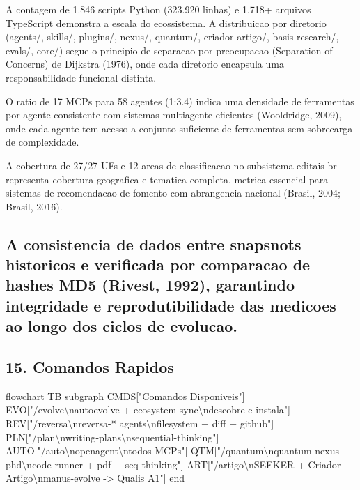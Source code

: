 \documentclass[
  12pt,
]{article}
\newenvironment{Shaded}{}{}
\newcommand{\NormalTok}[1]{#1}
\begin{document}
A contagem de 1.846 scripts Python (323.920 linhas) e 1.718+ arquivos
TypeScript demonstra a escala do ecossistema. A distribuicao por
diretorio (agents/, skills/, plugins/, nexus/, quantum/,
criador-artigo/, basis-research/, evals/, core/) segue o principio de
separacao por preocupacao (Separation of Concerns) de Dijkstra (1976),
onde cada diretorio encapsula uma responsabilidade funcional distinta.

O ratio de 17 MCPs para 58 agentes (1:3.4) indica uma densidade de
ferramentas por agente consistente com sistemas multiagente eficientes
(Wooldridge, 2009), onde cada agente tem acesso a conjunto suficiente de
ferramentas sem sobrecarga de complexidade.

A cobertura de 27/27 UFs e 12 areas de classificacao no subsistema
editais-br representa cobertura geografica e tematica completa, metrica
essencial para sistemas de recomendacao de fomento com abrangencia
nacional (Brasil, 2004; Brasil, 2016).

\subsection{A consistencia de dados entre snapsnots historicos e
verificada por comparacao de hashes MD5 (Rivest, 1992), garantindo
integridade e reprodutibilidade das medicoes ao longo dos ciclos de
evolucao.}\label{a-consistencia-de-dados-entre-snapsnots-historicos-e-verificada-por-comparacao-de-hashes-md5-rivest-1992-garantindo-integridade-e-reprodutibilidade-das-medicoes-ao-longo-dos-ciclos-de-evolucao.}

\subsection{15. Comandos Rapidos}\label{comandos-rapidos}

\begin{Shaded}
\begin{Highlighting}[]
\NormalTok{flowchart TB}
\NormalTok{subgraph CMDS["Comandos Disponiveis"]}
\NormalTok{EVO["/evolve\textbackslash{}nautoevolve + ecosystem{-}sync\textbackslash{}ndescobre e instala"]}
\NormalTok{REV["/reversa\textbackslash{}nreversa{-}* agents\textbackslash{}nfilesystem + diff + github"]}
\NormalTok{PLN["/plan\textbackslash{}nwriting{-}plans\textbackslash{}nsequential{-}thinking"]}
\NormalTok{AUTO["/auto\textbackslash{}nopenagent\textbackslash{}ntodos MCPs"]}
\NormalTok{QTM["/quantum\textbackslash{}nquantum{-}nexus{-}phd\textbackslash{}ncode{-}runner + pdf + seq{-}thinking"]}
\NormalTok{ART["/artigo\textbackslash{}nSEEKER + Criador Artigo\textbackslash{}nmanus{-}evolve {-}\textgreater{} Qualis A1"]}
\NormalTok{end}
\end{Highlighting}
\end{Shaded}
\end{document}

